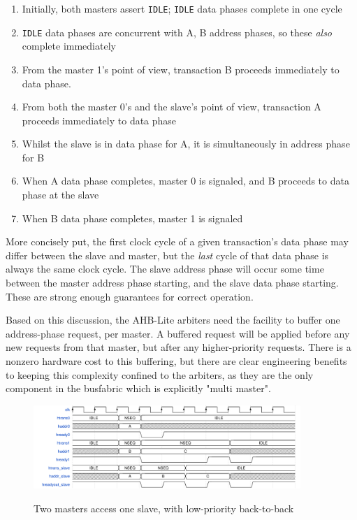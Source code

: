 \documentclass[notitlepage]{article}
\begin{document}
\begin{enumerate}
	\item Initially, both masters assert \texttt{IDLE}; \texttt{IDLE} data phases complete in one cycle
	\item \texttt{IDLE} data phases are concurrent with A, B address phases, so these \textit{also} complete immediately
	\item From the master 1's point of view, transaction B proceeds immediately to data phase.
	\item From both the master 0's and the slave's point of view, transaction A proceeds immediately to data phase
	\item Whilst the slave is in data phase for A, it is simultaneously in address phase for B
	\item When A data phase completes, master 0 is signaled, and B proceeds to data phase at the slave
	\item When B data phase completes, master 1 is signaled
\end{enumerate}

More concisely put, the first clock cycle of a given transaction's data phase may differ between the slave and master, but the \textit{last} cycle of that data phase is always the same clock cycle. The slave address phase will occur some time between the master address phase starting, and the slave data phase starting. These are strong enough guarantees for correct operation.

Based on this discussion, the AHB-Lite arbiters need the facility to buffer one address-phase request, per master. A buffered request will be applied before any new requests from that master, but after any higher-priority requests. There is a nonzero hardware cost to this buffering, but there are clear engineering benefits to keeping this complexity confined to the arbiters, as they are the only component in the busfabric which is explicitly "multi master".

\begin{figure}[H]
\centering
\caption{Two masters access one slave, with low-priority back-to-back}
\includegraphics[width=0.9\textwidth]{waves/ahbl_mm_simult2.pdf}
\label{diagram:ahbl_mm_simult2}
\end{figure}
\end{document}
